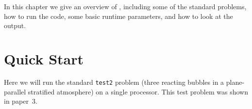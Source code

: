 

In this chapter we give an overview of \maestro, including some of the
standard problems, how to run the code, some basic runtime parameters,
and how to look at the output.

\section{Quick Start}

Here we will run the standard {\tt test2} problem (three reacting
bubbles in a plane-parallel stratified atmosphere) on a single
processor.  This test problem was shown in paper~3.  

